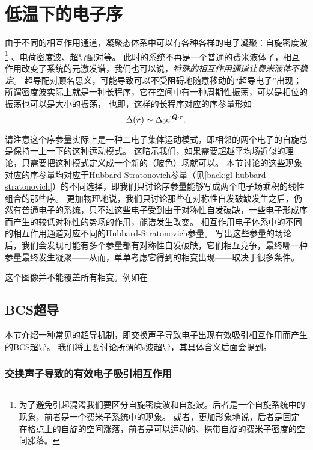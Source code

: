 \chapter{低温下的电子序}\label{chap:low-and-super}

由于不同的相互作用通道，凝聚态体系中可以有各种各样的电子凝聚：自旋密度波%
\footnote{
    为了避免引起混淆我们要区分自旋密度波和自旋波。后者是一个自旋系统中的现象，前者是一个费米子系统中的现象。
    或者，更加形象地说，后者是固定在格点上的自旋的空间涨落，前者是可以运动的、携带自旋的费米子密度的空间涨落。
}%
、电荷密度波、超导配对等。
此时的系统不再是一个普通的费米液体了，相互作用改变了系统的元激发谱，我们也可以说，\emph{特殊的相互作用通道让费米液体不稳定}。
超导配对顾名思义，可能导致可以不受阻碍地随意移动的“超导电子”出现；所谓密度波实际上就是一种长程序，它在空间中有一种周期性振荡，可以是相位的振荡也可以是大小的振荡，
也即，这样的长程序对应的序参量形如
\begin{equation}
    \Delta(\vb*{r}) \sim \Delta_0 \mathrm{e}^{\mathrm{i} \vb*{Q} \cdot \vb*{r}}.
\end{equation}

请注意这个序参量实际上是一种二电子集体运动模式，即相邻的两个电子的自旋总是保持一上一下的这种运动模式。
这暗示我们，如果需要超越平均场近似的理论，只需要把这种模式定义成一个新的（玻色）场就可以。
本节讨论的这些现象对应的序参量均对应于Hubbard-Stratonovich参量（见\autoref{back:gl-hubbard-stratonovich}）的不同选择，即我们只讨论序参量能够写成两个电子场乘积的线性组合的那些序。
更加物理地说，我们只讨论那些在对称性自发破缺发生之后，仍然有普通电子的系统，只不过这些电子受到由于对称性自发破缺，一些电子形成序而产生的较低对称性的势场的作用，能谱发生改变。
相互作用电子体系中的不同的相互作用通道对应不同的Hubbard-Stratonovich参量。
写出这些参量的场论后，我们会发现可能有多个参量都有对称性自发破缺，它们相互竞争，最终哪一种参量最终发生凝聚——从而，单单考虑它得到的相变出现——取决于很多条件。

这个图像并不能覆盖所有相变。例如在

\section{BCS超导}\label{sec:bcs-theory}

本节介绍一种常见的超导机制，即交换声子导致电子出现有效吸引相互作用而产生的BCS超导。
我们将主要讨论所谓的s波超导，其具体含义后面会提到。

\subsection{交换声子导致的有效电子吸引相互作用}\label{sec:phonon-caused-interaction}

